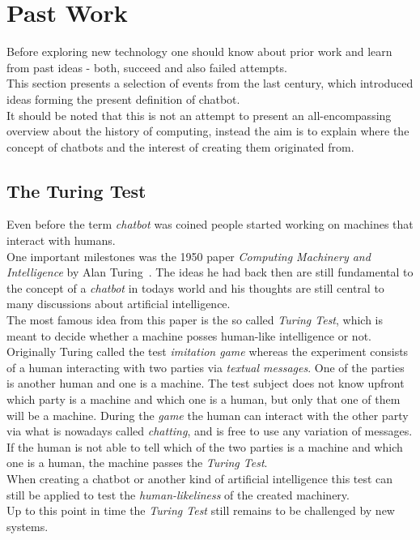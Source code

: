 \section{Past Work}


Before exploring new technology one should know about prior work and learn from past ideas - both, succeed and also failed attempts.
\\
This section presents a selection of events from the last century, which introduced ideas forming the present definition of chatbot.
\\
It should be noted that this is not an attempt to present an all-encompassing overview about the history of computing,
instead the aim is to explain where the concept of chatbots and the interest of creating them originated from.


\subsection{The Turing Test}

Even before the term \emph{chatbot} was coined people started working on machines that interact with humans.
\\
One important milestones was the 1950 paper \emph{Computing Machinery and Intelligence} by Alan Turing~\cite{turing}.
The ideas he had back then are still fundamental to the concept of a \emph{chatbot} in todays world
and his thoughts are still central to many discussions about artificial intelligence.
\\
The most famous idea from this paper is the so called \emph{Turing Test},
which is meant to decide whether a machine posses human-like intelligence or not.
\\
Originally Turing called the test \emph{imitation game} whereas the experiment consists of a human interacting with two parties via \emph{textual messages}.
One of the parties is another human and one is a machine.
The test subject does not know upfront which party is a machine and which one is a human, but only that one of them will be a machine.
During the \emph{game} the human can interact with the other party
via what is nowadays called \emph{chatting},
and is free to use any variation of messages.
\\
If the human is not able to tell which of the two parties is a machine and which one is a human, the machine passes the \emph{Turing Test}.
\\

When creating a chatbot or another kind of artificial intelligence this test can still be applied to test the \emph{human-likeliness} of the created machinery.
\\
Up to this point in time the \emph{Turing Test} still remains to be challenged by new systems.


